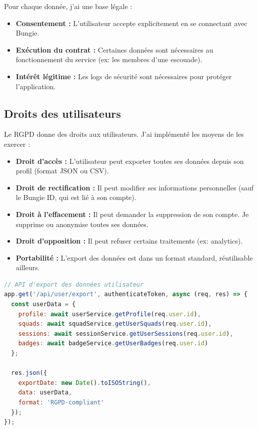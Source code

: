 Pour chaque donnée, j'ai une base légale :
\begin{itemize}
    \item \textbf{Consentement :} L'utilisateur accepte explicitement en se connectant avec Bungie.
    \item \textbf{Exécution du contrat :} Certaines données sont nécessaires au fonctionnement du service (ex: les membres d'une escouade).
    \item \textbf{Intérêt légitime :} Les logs de sécurité sont nécessaires pour protéger l'application.
\end{itemize}

\subsection{Droits des utilisateurs}

Le RGPD donne des droits aux utilisateurs. J'ai implémenté les moyens de les exercer :

\begin{itemize}
    \item \textbf{Droit d'accès :} L'utilisateur peut exporter toutes ses données depuis son profil (format JSON ou CSV).
    \item \textbf{Droit de rectification :} Il peut modifier ses informations personnelles (sauf le Bungie ID, qui est lié à son compte).
    \item \textbf{Droit à l'effacement :} Il peut demander la suppression de son compte. Je supprime ou anonymise toutes ses données.
    \item \textbf{Droit d'opposition :} Il peut refuser certains traitements (ex: analytics).
    \item \textbf{Portabilité :} L'export des données est dans un format standard, réutilisable ailleurs.
\end{itemize}

\begin{lstlisting}[language=JavaScript]
// API d'export des données utilisateur
app.get('/api/user/export', authenticateToken, async (req, res) => {
  const userData = {
    profile: await userService.getProfile(req.user.id),
    squads: await squadService.getUserSquads(req.user.id),
    sessions: await sessionService.getUserSessions(req.user.id),
    badges: await badgeService.getUserBadges(req.user.id)
  };
  
  res.json({
    exportDate: new Date().toISOString(),
    data: userData,
    format: 'RGPD-compliant'
  });
});
\end{lstlisting}

